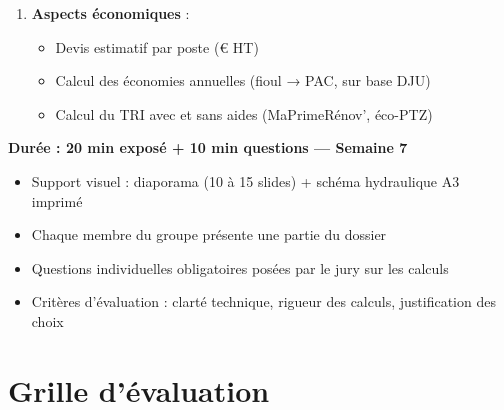 \begin{methode}
\begin{enumerate}
  \item \textbf{Aspects économiques} :
    \begin{itemize}
      \item Devis estimatif par poste (€ HT)
      \item Calcul des économies annuelles (fioul → PAC, sur base DJU)
      \item Calcul du TRI avec et sans aides (MaPrimeRénov', éco-PTZ)
    \end{itemize}
\end{enumerate}
\end{methode}

\begin{methode}
\textbf{Durée : 20 min exposé + 10 min questions — Semaine 7}

\begin{itemize}
  \item Support visuel : diaporama (10 à 15 slides) + schéma hydraulique A3 imprimé
  \item Chaque membre du groupe présente une partie du dossier
  \item Questions individuelles obligatoires posées par le jury sur les calculs
  \item Critères d'évaluation : clarté technique, rigueur des calculs, justification des choix
\end{itemize}
\end{methode}

\section{Grille d'évaluation}

